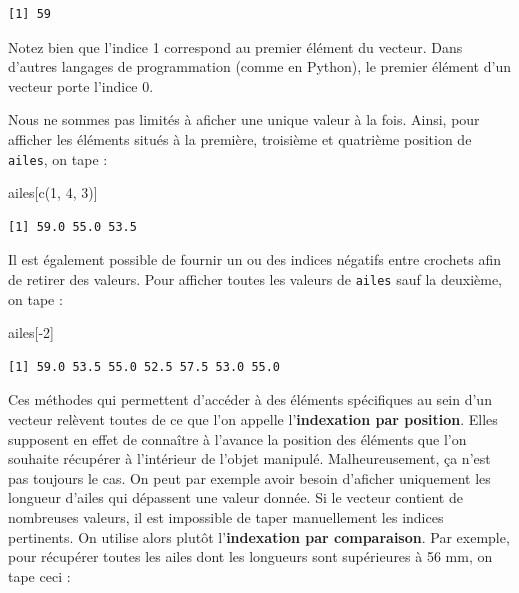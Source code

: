 \documentclass[
  a4paper,
  DIV=11,
  numbers=noendperiod,
  oneside]{scrreprt}
\newenvironment{Shaded}{}{}
\newcommand{\DecValTok}[1]{\textcolor[rgb]{0.00,0.36,0.77}{#1}}
\newcommand{\FunctionTok}[1]{\textcolor[rgb]{0.44,0.26,0.76}{#1}}
\newcommand{\NormalTok}[1]{\textcolor[rgb]{0.14,0.16,0.18}{#1}}
\newcommand{\SpecialCharTok}[1]{\textcolor[rgb]{0.00,0.36,0.77}{#1}}
\begin{document}
\begin{verbatim}
[1] 59
\end{verbatim}

Notez bien que l'indice 1 correspond au premier élément du vecteur. Dans
d'autres langages de programmation (comme en Python), le premier élément
d'un vecteur porte l'indice 0.

Nous ne sommes pas limités à aficher une unique valeur à la fois. Ainsi,
pour afficher les éléments situés à la première, troisième et quatrième
position de \texttt{ailes}, on tape :

\begin{Shaded}
\begin{Highlighting}[]
\NormalTok{ailes[}\FunctionTok{c}\NormalTok{(}\DecValTok{1}\NormalTok{, }\DecValTok{4}\NormalTok{, }\DecValTok{3}\NormalTok{)]}
\end{Highlighting}
\end{Shaded}

\begin{verbatim}
[1] 59.0 55.0 53.5
\end{verbatim}

Il est également possible de fournir un ou des indices négatifs entre
crochets afin de retirer des valeurs. Pour afficher toutes les valeurs
de \texttt{ailes} sauf la deuxième, on tape :

\begin{Shaded}
\begin{Highlighting}[]
\NormalTok{ailes[}\SpecialCharTok{{-}}\DecValTok{2}\NormalTok{]}
\end{Highlighting}
\end{Shaded}

\begin{verbatim}
[1] 59.0 53.5 55.0 52.5 57.5 53.0 55.0
\end{verbatim}

Ces méthodes qui permettent d'accéder à des éléments spécifiques au sein
d'un vecteur relèvent toutes de ce que l'on appelle l'\textbf{indexation
par position}. Elles supposent en effet de connaître à l'avance la
position des éléments que l'on souhaite récupérer à l'intérieur de
l'objet manipulé. Malheureusement, ça n'est pas toujours le cas. On peut
par exemple avoir besoin d'aficher uniquement les longueur d'ailes qui
dépassent une valeur donnée. Si le vecteur contient de nombreuses
valeurs, il est impossible de taper manuellement les indices pertinents.
On utilise alors plutôt l'\textbf{indexation par comparaison}. Par
exemple, pour récupérer toutes les ailes dont les longueurs sont
supérieures à 56 mm, on tape ceci :
\end{document}

